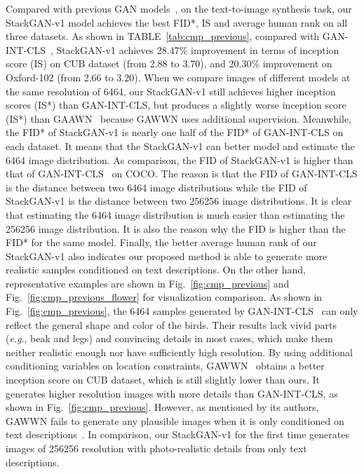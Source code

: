 \documentclass[10pt,journal,letterpaper,compsoc]{IEEEtran}
\begin{document}
{Compared with previous GAN models~\cite{reed2016generative,reed2016learning}, on the text-to-image synthesis task, our StackGAN-v1 model achieves the best FID*, IS and average human rank on all three datasets. As shown in TABLE~\ref{tab:cmp_previous}, compared with GAN-INT-CLS~\cite{reed2016generative}, StackGAN-v1 achieves 28.47\% improvement in terms of inception score (IS) on CUB dataset (from 2.88 to 3.70), and 20.30\% improvement on Oxford-102 (from 2.66 to 3.20). When we compare images of different models at the same resolution of 6464, our StackGAN-v1 still achieves higher inception scores (IS*) than GAN-INT-CLS, but produces a slightly worse inception score (IS*) than GAAWN~\cite{reed2016learning} because GAWWN uses additional supervision. Meanwhile, the FID* of StackGAN-v1 is nearly one half of the FID* of GAN-INT-CLS on each dataset. It means that the StackGAN-v1 can better model and estimate the 6464 image distribution.  As comparison, the FID of StackGAN-v1 is higher than that of GAN-INT-CLS~\cite{reed2016generative} on COCO. The reason is that the FID of GAN-INT-CLS is the distance between two 6464 image distributions while the FID of StackGAN-v1 is the distance between two 256256 image distributions. It is clear that estimating the 6464 image distribution is much easier than estimating the  256256 image distribution. It is also the reason why the FID is higher than the FID* for the same model. Finally, the better average human rank of our StackGAN-v1 also indicates our proposed method is able to generate more realistic samples conditioned on text descriptions. On the other hand, representative examples are shown in Fig.~\ref{fig:cmp_previous} and Fig.~\ref{fig:cmp_previous_flower} for visualization comparison. As shown in Fig.~\ref{fig:cmp_previous}, the 6464 samples generated by GAN-INT-CLS~\cite{reed2016generative} can only reflect the general shape and color of the birds. Their results lack vivid parts (\emph{e.g}., beak and legs) and convincing details in most cases, which make them neither realistic enough nor have sufficiently high resolution. By using additional conditioning variables on location constraints, GAWWN~\cite{reed2016learning} obtains a better inception score on CUB dataset, which is still slightly lower than ours. It generates higher resolution images with more details than GAN-INT-CLS, as shown in Fig.~\ref{fig:cmp_previous}. However, as mentioned by its authors, GAWWN fails to generate any plausible images when it is only conditioned on text descriptions~\cite{reed2016learning}. In comparison, our StackGAN-v1 for the first time generates images of 256256 resolution with photo-realistic details from only text descriptions. 
}
\end{document}
